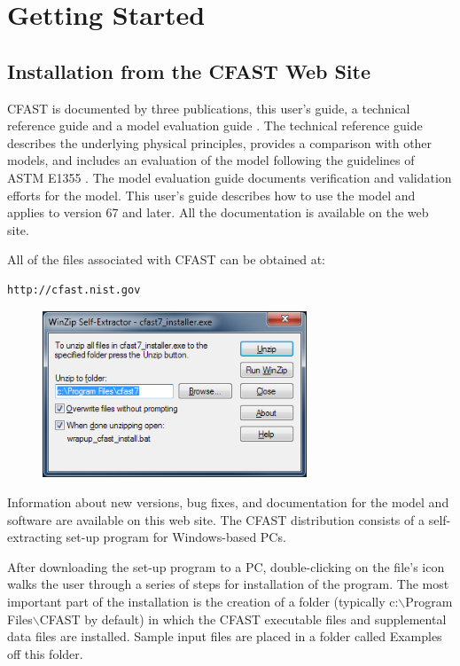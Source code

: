 
\chapter{Getting Started}

\section{Installation from the CFAST Web Site}

CFAST is documented by three publications, this user's guide, a technical reference guide \cite{CFAST_Tech_Guide_7} and a model evaluation guide \cite{CFAST_Valid_Guide_7}. The technical reference guide describes the underlying physical principles, provides a comparison with other models, and includes an evaluation of the model following the guidelines of ASTM E1355 \cite{ASTM:E1355}. The model evaluation guide documents verification and validation efforts for the model. This user's guide describes how to use the model and applies to version 67 and later.  All the documentation is available on the web site.

All of the files associated with CFAST can be obtained at:

\begin{lstlisting}
http://cfast.nist.gov
\end{lstlisting}

\begin{figure}
  \includegraphics[width=3.1in]{FIGURES/Getting_Started/Install}
\end{figure}

Information about new versions, bug fixes, and documentation for the model and software are available on this web site.  The CFAST distribution consists of a self-extracting set-up program for Windows-based PCs.

After downloading the set-up program to a PC, double-clicking on the file's icon walks the user through a series of steps for installation of the program.  The most important part of the installation is the creation of a folder (typically c:$\backslash$Program Files$\backslash$CFAST by default) in which the CFAST executable files and supplemental data files are installed.  Sample input files are placed in a folder called Examples off this folder.

